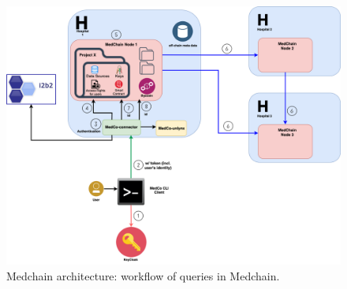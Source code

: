  
 \begin{figure}[htbp] 
        \centering \includegraphics[width=1\columnwidth]{Images/medchain_msg.png}
        \caption{\label{fig:medchain_workflow} 
         Medchain architecture: workflow of queries in Medchain.
        }
\end{figure}
